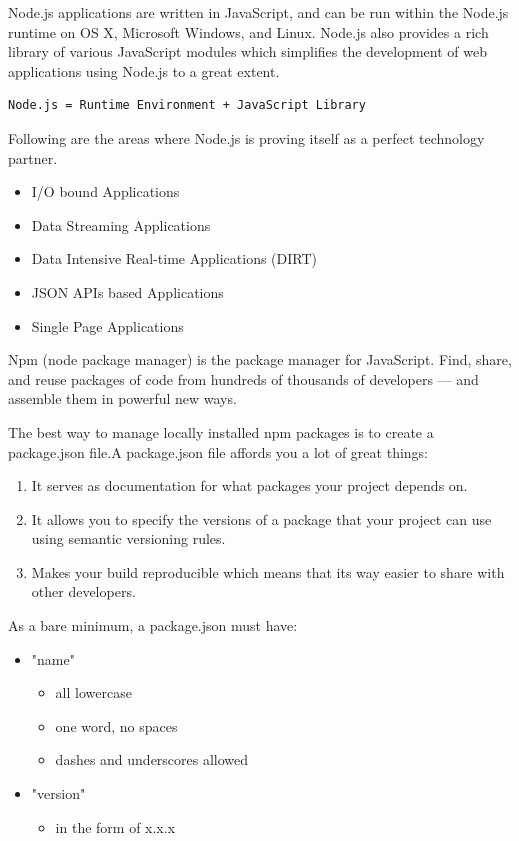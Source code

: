 \documentclass[a4paper, 12pt]{book}
\begin{document}
Node.js applications are written in JavaScript, and can be run within the Node.js runtime on OS X, Microsoft Windows, and Linux. Node.js also provides a rich library of various JavaScript modules which simplifies the development of web applications using Node.js to a great extent.

\begin{lstlisting}[frame=single]
Node.js = Runtime Environment + JavaScript Library
\end{lstlisting}

Following are the areas where Node.js is proving itself as a perfect technology partner.
\begin{itemize}
\item I/O bound Applications
\item Data Streaming Applications
\item Data Intensive Real-time Applications (DIRT)
\item JSON APIs based Applications
\item Single Page Applications
\end{itemize}


Npm (node package manager) is the package manager for JavaScript. Find, share, and reuse packages of code from hundreds of thousands of developers — and assemble them in powerful new ways. 

The best way to manage locally installed npm packages is to create a package.json file.A package.json file affords you a lot of great things:
\begin{enumerate}
\item It serves as documentation for what packages your project depends on.
\item It allows you to specify the versions of a package that your project can use using semantic versioning rules.
\item Makes your build reproducible which means that its way easier to share with other developers.
\end{enumerate}

As a bare minimum, a package.json must have:
\begin{itemize}
\item "name"
\begin{itemize}
\item all lowercase
\item one word, no spaces
\item dashes and underscores allowed
\end{itemize}
\item "version"
\begin{itemize}
\item in the form of x.x.x
\end{itemize}
\end{itemize}
\end{document}
